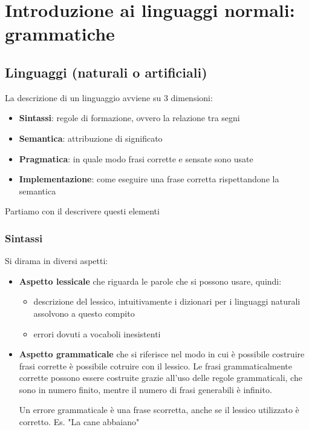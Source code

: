 \chapter{Introduzione ai linguaggi normali: grammatiche}


\section{Linguaggi (naturali o artificiali)}

La descrizione di un linguaggio avviene su 3 dimensioni:
\begin{itemize}
    \item \textbf{Sintassi}: regole di formazione, ovvero la relazione tra segni
    \item \textbf{Semantica}: attribuzione di significato
    \item \textbf{Pragmatica}: in quale modo frasi corrette e sensate sono usate
    \item \textbf{Implementazione}: come eseguire una frase corretta rispettandone la semantica
\end{itemize}

Partiamo con il descrivere questi elementi

\subsection{Sintassi}



Si dirama in diversi aspetti: 
\begin{itemize}
    \item \textbf{Aspetto lessicale} che riguarda le parole che si possono usare, quindi:
    \begin{itemize}
        \item descrizione del lessico, intuitivamente i dizionari per i linguaggi naturali assolvono a questo compito
        \item errori dovuti a vocaboli inesistenti
    \end{itemize}
    \item \textbf{Aspetto grammaticale} che si riferisce nel modo in cui è possibile costruire frasi corrette è possibile cotruire con il lessico. Le frasi grammaticalmente corrette possono essere costruite grazie all'uso delle regole grammaticali, che sono in numero finito, mentre il numero di frasi generabili è infinito.
    
    Un errore grammaticale è una frase scorretta, anche se il lessico utilizzato è corretto. Es. "La cane abbaiano"
\end{itemize}

